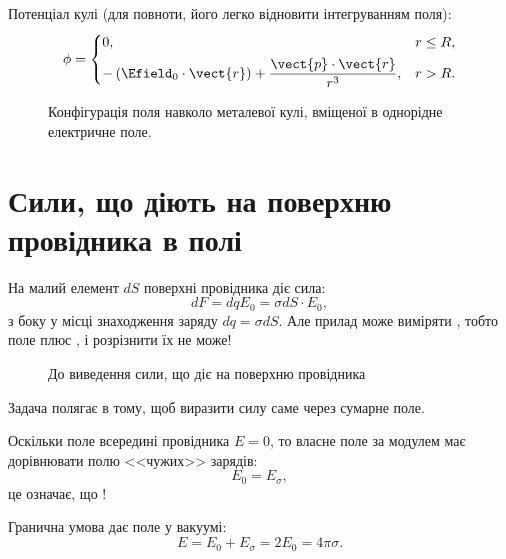 Потенціал кулі (для повноти, його легко відновити інтегруванням поля):
\begin{equation*}
    \phi =
    \begin{cases}
        0, & r \le R, \\[4pt]
        -\left(\Efield_0\cdot\vect{r}\right)
        + \dfrac{\vect{p}\cdot\vect{r}}{r^3}, & r > R .
    \end{cases}
\end{equation*}

\begin{figure}[h!]
    \centering
    \caption{Конфігурація поля навколо металевої кулі, вміщеної
    в однорідне електричне поле.\label{tikz:EfieldMetall}}
\end{figure}

\section{Сили, що діють на поверхню провідника в полі}


На малий елемент $dS$ поверхні провідника діє сила:
\begin{equation*}
	dF = dq E_0 = \sigma dS \cdot  E_0,
\end{equation*}
з боку  у місці
знаходження заряду $dq = \sigma dS$. Але прилад може виміряти , тобто поле   плюс , і  розрізнити їх не може!

\begin{figure}%
    \centering
    \caption{До виведення сили, що діє на поверхню провідника}
\end{figure}

Задача полягає в тому, щоб виразити силу саме через сумарне поле.

Оскільки поле всередині провідника $E = 0$, то власне поле за модулем має дорівнювати
полю <<чужих>> зарядів:
\begin{equation*}
	E_0 = E_{\sigma},
\end{equation*}
це означає, що !


Гранична умова дає поле у вакуумі:
\begin{equation*}
	E = E_0 + E_{\sigma} = 2 E_0 = 4\pi\sigma.
\end{equation*}


